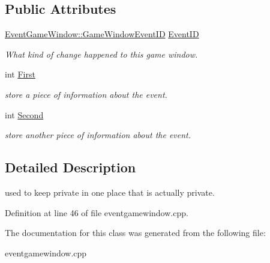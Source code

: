 \subsection*{Public Attributes}
\begin{DoxyCompactItemize}
\item 
\hypertarget{classphys_1_1EventGameWindowData_aee5633e59e1f147d001d04e98a4f53a0}{
\hyperlink{classphys_1_1EventGameWindow_a45225255070513d3cff88cdfea25cc09}{EventGameWindow::GameWindowEventID} \hyperlink{classphys_1_1EventGameWindowData_aee5633e59e1f147d001d04e98a4f53a0}{EventID}}
\label{d1/d45/classphys_1_1EventGameWindowData_aee5633e59e1f147d001d04e98a4f53a0}

\begin{DoxyCompactList}\small\item\em What kind of change happened to this game window. \item\end{DoxyCompactList}\item 
\hypertarget{classphys_1_1EventGameWindowData_ac21fb863e39f60821ea8017025884078}{
int \hyperlink{classphys_1_1EventGameWindowData_ac21fb863e39f60821ea8017025884078}{First}}
\label{d1/d45/classphys_1_1EventGameWindowData_ac21fb863e39f60821ea8017025884078}

\begin{DoxyCompactList}\small\item\em store a piece of information about the event. \item\end{DoxyCompactList}\item 
\hypertarget{classphys_1_1EventGameWindowData_ae4d7e70e2539f90dc18272bc092b711e}{
int \hyperlink{classphys_1_1EventGameWindowData_ae4d7e70e2539f90dc18272bc092b711e}{Second}}
\label{d1/d45/classphys_1_1EventGameWindowData_ae4d7e70e2539f90dc18272bc092b711e}

\begin{DoxyCompactList}\small\item\em store another piece of information about the event. \item\end{DoxyCompactList}\end{DoxyCompactItemize}


\subsection{Detailed Description}
used to keep private in one place that is actually private. 

Definition at line 46 of file eventgamewindow.cpp.



The documentation for this class was generated from the following file:\begin{DoxyCompactItemize}
\item 
eventgamewindow.cpp\end{DoxyCompactItemize}
